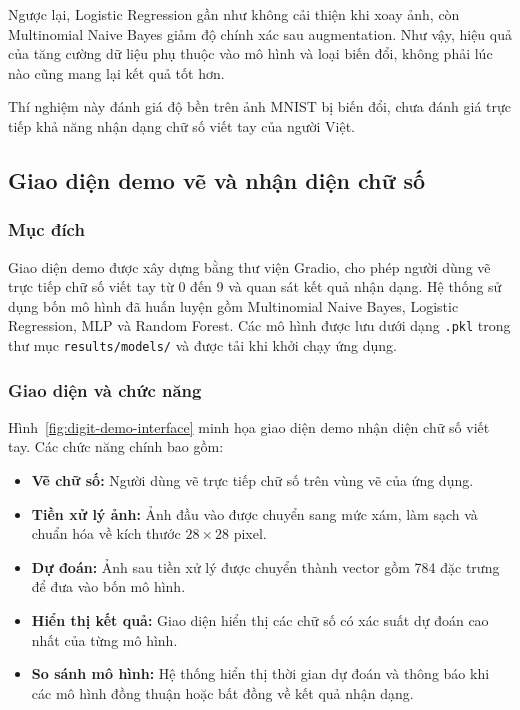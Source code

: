 Ngược lại, Logistic Regression gần như không cải thiện khi xoay
ảnh, còn Multinomial Naive Bayes giảm độ chính xác sau augmentation.
Như vậy, hiệu quả của tăng cường dữ liệu phụ thuộc vào mô hình
và loại biến đổi, không phải lúc nào cũng mang lại kết quả tốt hơn.

Thí nghiệm này đánh giá độ bền trên ảnh MNIST bị biến đổi, chưa
đánh giá trực tiếp khả năng nhận dạng chữ số viết tay của người Việt.


\subsection{Giao diện demo vẽ và nhận diện chữ số}

\subsubsection{Mục đích}

Giao diện demo được xây dựng bằng thư viện Gradio, cho phép
người dùng vẽ trực tiếp chữ số viết tay từ 0 đến 9 và quan sát
kết quả nhận dạng. Hệ thống sử dụng bốn mô hình đã huấn luyện
gồm Multinomial Naive Bayes, Logistic Regression, MLP và
Random Forest. Các mô hình được lưu dưới dạng \texttt{.pkl}
trong thư mục \texttt{results/models/} và được tải khi khởi
chạy ứng dụng.

\subsubsection{Giao diện và chức năng}

Hình~\ref{fig:digit-demo-interface} minh họa giao diện demo
nhận diện chữ số viết tay. Các chức năng chính bao gồm:

\begin{itemize}
    \item \textbf{Vẽ chữ số:} Người dùng vẽ trực tiếp chữ số
    trên vùng vẽ của ứng dụng.

    \item \textbf{Tiền xử lý ảnh:} Ảnh đầu vào được chuyển
    sang mức xám, làm sạch và chuẩn hóa về kích thước
    $28\times28$ pixel.

    \item \textbf{Dự đoán:} Ảnh sau tiền xử lý được chuyển
    thành vector gồm 784 đặc trưng để đưa vào bốn mô hình.

    \item \textbf{Hiển thị kết quả:} Giao diện hiển thị các
    chữ số có xác suất dự đoán cao nhất của từng mô hình.

    \item \textbf{So sánh mô hình:} Hệ thống hiển thị thời gian
    dự đoán và thông báo khi các mô hình đồng thuận hoặc
    bất đồng về kết quả nhận dạng.
\end{itemize}

